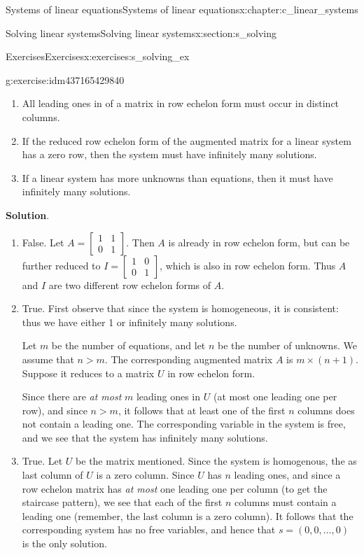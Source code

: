 \documentclass[oneside,10pt,]{book}
\newcommand{\blocktitlefont}{\relax}
\numberwithin{equation}{section}
\newcommand{\amp}{&}
\begin{document}
\begin{chapterptx}{Systems of linear equations}{}{Systems of linear equations}{}{}{x:chapter:c_linear_systems}
\begin{sectionptx}{Solving linear systems}{}{Solving linear systems}{}{}{x:section:s_solving}
\begin{exercises-subsection-numberless}{Exercises}{}{Exercises}{}{}{x:exercises:s_solving_ex}
\begin{divisionexercise}{8}{}{}{g:exercise:idm437165429840}
\begin{enumerate}[marker=(\alph*)]
\item{}All leading ones in of a matrix in row echelon form must occur in distinct columns.%
\item{}If the reduced row echelon form of the augmented matrix for a linear system has a zero row, then the system must have infinitely many solutions.%
\item{}If a linear system has more unknowns than equations, then it must have infinitely many solutions.%
\end{enumerate}
\par\smallskip%
\noindent\textbf{\blocktitlefont Solution}.\hypertarget{g:solution:idm437165423088}{}\quad{}%
\begin{enumerate}[marker=(\alph*)]
\item{}False. Let \(A=\begin{bmatrix}1\amp 1\\ 0\amp 1 \end{bmatrix}\). Then \(A\) is already in row echelon form, but can be further reduced to \(I=\begin{bmatrix}1\amp 0\\0\amp 1 \end{bmatrix}\), which is also in row echelon form. Thus \(A\) and \(I\) are two different row echelon forms of \(A\).%
\item{}True. First observe that since the system is homogeneous, it is consistent: thus we have either 1 or infinitely many solutions.%
\par
Let \(m\) be the number of equations, and let \(n\) be the number of unknowns. We assume that \(n>m\). The corresponding augmented matrix \(A\) is \(m\times (n+1)\). Suppose it reduces to a matrix \(U\) in row echelon form.%
\par
Since there are \emph{at most} \(m\) leading ones in \(U\) (at most one leading one per row), and since \(n>m\), it follows that at least one of the first \(n\) columns does not contain a leading one. The corresponding variable in the system is free, and we see that the system has infinitely many solutions.%
\item{}True. Let \(U\) be the matrix mentioned. Since the system is homogenous, the as last column of \(U\) is a zero column. Since \(U\) has \(n\) leading ones, and since a row echelon matrix has \emph{at most} one leading one per column (to get the staircase pattern), we see that each of the first \(n\) columns must contain a leading one (remember, the last column is a zero column).  It follows that the corresponding system has no free variables, and hence that \(s=(0,0,\dots, 0)\) is the only solution.%

\end{enumerate}
\end{divisionexercise}
\end{exercises-subsection-numberless}
\end{sectionptx}
\end{chapterptx}
\end{document}
